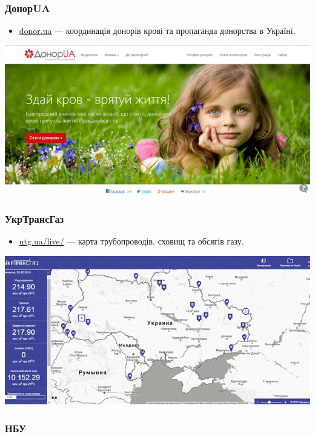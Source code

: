 \subsubsection{ДонорUA}

\begin{itemize}
    \item \href{http://donor.ua/}{donor.ua} — координація донорів крові та пропаганда донорства в Україні.
\end{itemize}

\includegraphics{images/018.gif}

\subsubsection{УкрТрансГаз}

\begin{itemize}
    \item \href{http://utg.ua/live/}{utg.ua/live/} — карта трубопроводів, сховищ та обсягів газу.
\end{itemize}

\includegraphics{images/019.gif}

\subsubsection{НБУ}

